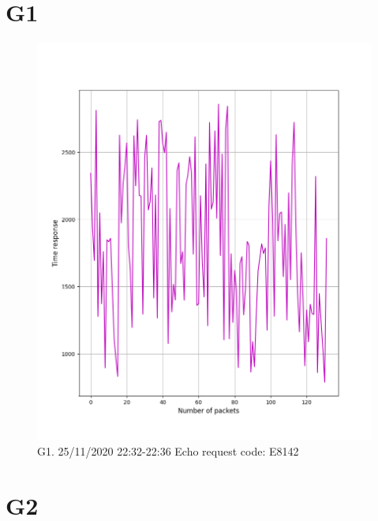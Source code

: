 \documentclass[hidelinks, 12pt, a4paper]{article}
\begin{document}



\pagebreak
\tableofcontents
\pagebreak



\section{G1}

\begin{figure}[h!]
\centering
	\includegraphics[height=.38\textheight, width=\textwidth]{assets/session1/g1.png}
	\caption{G1. 25/11/2020 22:32-22:36 Echo request code: E8142} 
\end{figure}

\section{G2}
\end{document}
